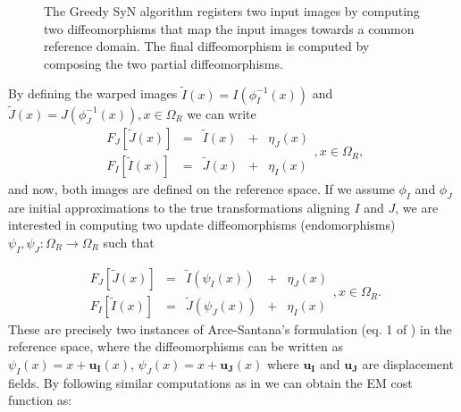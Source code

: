 \begin{figure}[H]
\centering
{}
\caption{The Greedy SyN algorithm registers two input images by computing two diffeomorphisms that map the input images towards a common reference domain. The final
diffeomorphism is computed by composing the two partial diffeomorphisms.}
\label{fig:syn_overview}
\end{figure}

By defining the warped images $\tilde{I}(x) = I(\phi_{I}^{-1}(x))$ and $\tilde{J}(x) = J(\phi_{J}^{-1}(x)), x \in \Omega_{R}$ we can write
\begin{equation}\label{eq:SyNEM_gom_warped}
    \begin{array}{ccccc}
        F_{J}[\tilde{J}(x)] &=& \tilde{I}(x) &+& \eta_{J}(x)\\
        F_{I}[\tilde{I}(x)] &=& \tilde{J}(x) &+& \eta_{I}(x)
    \end{array}, x\in\Omega_{R},
\end{equation}
and now, both images are defined on the reference space. If we assume $\phi_{I}$ and $\phi_{J}$ are initial approximations to the true transformations
aligning $I$ and $J$, we are interested in computing two update diffeomorphisms (endomorphisms) \hbox{$\psi_{I}, \psi_{J} : \Omega_{R} \rightarrow \Omega_{R}$} such that

\begin{equation}\label{eq:SyNEM_gom_update}
    \begin{array}{ccccc}
    	F_{J}[\tilde{J}(x)] &=& \tilde{I}(\psi_{I}(x)) &+& \eta_{J}(x)\\
        F_{I}[\tilde{I}(x)] &=& \tilde{J}(\psi_{J}(x)) &+& \eta_{I}(x)
    \end{array}, x\in\Omega_{R}.
\end{equation}
These are precisely two instances of Arce-Santana's formulation (eq. 1 of \cite{Arce-santana2014}) in the reference space, where the diffeomorphisms can be written as
\hbox{$\psi_{I}(x) = x + \mathbf{u_{I}}(x)$}, \hbox{$\psi_{J}(x) = x + \mathbf{u_{J}}(x)$} where $\mathbf{u_{I}}$ and $\mathbf{u_{J}}$ are displacement fields. By following
similar computations as in \cite{Arce-santana2014} we can obtain the EM cost function as:

